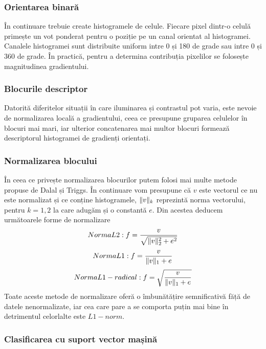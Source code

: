 \subsubsection {Orientarea binară}

În continuare trebuie create histogramele de celule. Fiecare pixel dintr-o celulă primește un vot ponderat pentru o poziție pe un canal orientat al histogramei. Canalele histogramei sunt distribuite uniform intre 0 și 180 de grade sau intre 0 și 360 de grade. În practică, pentru a determina contribuția pixelilor se folosește magnitudinea gradientului.

\subsubsection {Blocurile descriptor}

Datorită diferitelor situații în care iluminarea și contrastul pot varia, este nevoie de normalizarea locală a gradientului, ceea ce presupune gruparea celulelor în blocuri mai mari, iar ulterior concatenarea mai multor blocuri formează descriptorul histogramei de gradienți orientați.

\subsubsection {Normalizarea blocului}

În ceea ce privește normalizarea blocurilor putem folosi mai multe metode propuse de Dalal și Triggs. În continuare vom presupune că $v$ este vectorul ce nu este normalizat și ce conține histogramele, $\lVert v\rVert_k$ reprezintă norma vectorului, pentru $k = 1,2$ la care adugăm și o constantă $e$. Din acestea deducem următoarele forme de normalizare
\begin{align}	
	Norma L2: f = \frac{v}{\sqrt{\lVert v\rVert_2^2 + e^2}}
\end{align}
\begin{align}	
	Norma L1: f = \frac{v}{\lVert v\rVert_1 + e}
\end{align}
\begin{align}	
	Norma L1-radical: f = \sqrt{\frac{v}{\lVert v\rVert_1 + e}}
\end{align}
Toate aceste metode de normalizare oferă o îmbunătățire semnificativă făță de datele nenormalizate, iar cea care pare a se comporta puțin mai bine în detrimentul celorlalte este $L1-norm$.

\subsubsection {Clasificarea cu suport vector mașină}

